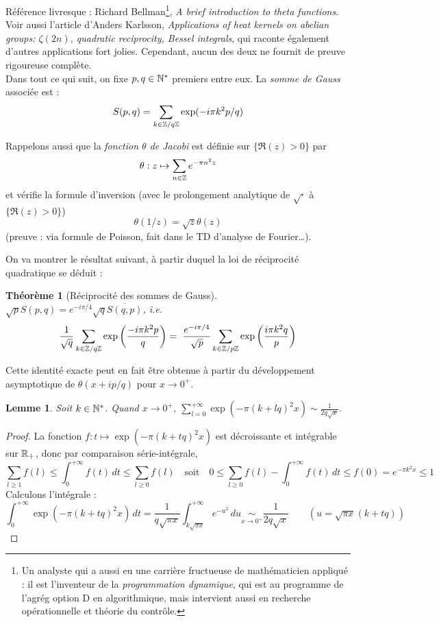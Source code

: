 \documentclass[a4paper, 11pt]{article}
\newtheorem*{theorem}{Théorème}
\newtheorem*{lemma}{Lemme}
\begin{document}
Référence livresque : Richard Bellman\footnote{Un analyste qui a aussi eu une
  carrière fructueuse de mathématicien appliqué : il est l'inventeur de la
  \emph{programmation dynamique}, qui est au programme de l'agrég option D en
  algorithmique, mais intervient aussi en recherche opérationnelle et théorie du
  contrôle.}, \emph{A brief introduction to theta functions}. Voir aussi
l'article d'Anders Karlsson, \emph{Applications of heat kernels on abelian
  groups: $\zeta(2n)$, quadratic reciprocity, Bessel integrals}, qui raconte
également d'autres applications fort jolies. Cependant, aucun des deux ne
fournit de preuve rigoureuse complète.\\

Dans tout ce qui suit, on fixe $p, q \in \mathbb{N}^*$ premiers entre eux. La
\emph{somme de Gauss} associée est :
\[S(p,q) = \sum_{k \in \mathbb{Z}/q\mathbb{Z}} \exp(-i\pi k^2 p/q) \]

Rappelons aussi que la \emph{fonction $\theta$ de Jacobi} est définie sur
$\{\Re(z) > 0\}$ par
\[ \theta : z \mapsto \sum_{n \in \mathbb{Z}} e^{-\pi n^2 z} \]
et vérifie la formule d'inversion (avec le prolongement analytique de
$\sqrt{\cdot}$ à $\{\Re(z) > 0\}$)
\[ \theta(1/z) = \sqrt{z}\theta(z) \]
(preuve : via formule de Poisson, fait dans le TD d'analyse de Fourier…).

On va montrer le résultat suivant, à partir duquel la loi de réciprocité
quadratique se déduit :

\begin{theorem}[Réciprocité des sommes de Gauss]
  $\sqrt{p}S(p,q) = e^{-i\pi/4}\sqrt{q}\overline{S(q,p)}$, i.e.
  \[ \frac{1}{\sqrt{q}} \sum_{k \in \mathbb{Z}/q\mathbb{Z}}
    \exp\left(\frac{-i\pi k^2 p}{q}\right) =
    \ \frac{e^{-i\pi/4}}{\sqrt{p}} \sum_{k \in \mathbb{Z}/p\mathbb{Z}}
    \exp\left(\frac{i\pi k^2 q}{p}\right) \]
\end{theorem}

Cette identité exacte peut en fait être obtenue à partir du développement
asymptotique de $\theta(x + ip/q)$ pour $x \to 0^+$.

\begin{lemma} Soit $k \in \mathbb{N}^*$. Quand $x \to 0^+$,
  $\displaystyle \sum_{l = 0}^{+\infty} \exp(-\pi(k+lq)^2x)
  \sim \frac{1}{2q\sqrt{x}}$.
\end{lemma}

\begin{proof}
  La fonction $f : t \mapsto \exp(-\pi(k+tq)^2x)$ est décroissante et intégrable
  sur $\mathbb{R}_+$, donc par comparaison série-intégrale,
 \[ \sum_{l \geq 1} f(l) \leq \int_0^{+\infty} f(t)\,dt \leq
   \sum_{l \geq 0} f(l) \quad \text{soit} \quad
   0 \leq \sum_{l \geq 0} f(l) - \int_0^{+\infty} f(t)\,dt \leq f(0) =
   e^{-\pi k^2 x} \leq 1
 \]
 Calculons l'intégrale :
 \[ \int_0^{+\infty} \exp(-\pi(k+tq)^2x)\,dt =
   \frac{1}{q\sqrt{\pi x}} \int_{k\sqrt{\pi x}}^{+\infty} e^{-u^2}\,du
    \underset{x \to 0^+}{\sim} \frac{1}{2q\sqrt{x}}
   \qquad
  (u = \sqrt{\pi x}(k + tq))
\]
\end{proof}
\end{document}
